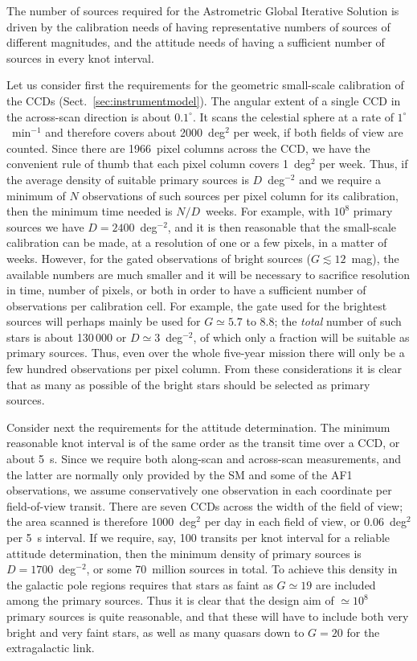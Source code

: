 \documentclass[structabstract]{aa}
\begin{document}
The number of sources required for the Astrometric Global Iterative Solution is
driven by the calibration needs of having representative numbers of sources of
different magnitudes, and the attitude needs of having a sufficient
number of sources in every knot interval.

Let us consider first the requirements for the geometric small-scale 
calibration of the CCDs (Sect.~\ref{sec:instrumentmodel}). The angular extent
of a single CCD in the across-scan direction is about $0.1^\circ$. It scans the
celestial sphere at a rate of $1^\circ$~min$^{-1}$ and therefore covers about 
2000~deg$^2$ per week, if both fields of view are counted. Since there are
1966~pixel columns across the CCD, we have the convenient rule of thumb
that each pixel column covers 1~deg$^2$ per week. Thus, if the average density
of suitable primary sources is $D$~deg$^{-2}$ and we require a minimum of $N$
observations of such sources per pixel column for its calibration, then the 
minimum time needed is $N/D$~weeks. For example, with $10^8$ primary 
sources we have $D=2400$~deg$^{-2}$, and it is then reasonable that the
small-scale calibration can be made, at a resolution of one or a few pixels,
in a matter of weeks. However, for the gated observations of bright sources
($G\lesssim 12$~mag), the available numbers are much smaller and it will be
necessary to sacrifice resolution in time, number of pixels, or both in order
to have a sufficient number of observations per calibration cell. For example,
the gate used for the brightest sources will perhaps mainly be used for 
$G\simeq 5.7$ to 8.8; the \emph{total} number of such stars is about 
130\,000 \citep[from the Tycho-2 Catalogue;][]{hog+00} or
$D\simeq 3$~deg$^{-2}$, of which only a fraction will be suitable as
primary sources. Thus, even over the whole five-year mission there will
only be a few hundred observations per pixel column. From these considerations
it is clear that as many as possible of the bright stars should be selected
as primary sources. 

Consider next the requirements for the attitude determination. The minimum
reasonable knot interval is of the same order as the transit time over a
CCD, or about 5~s. Since we require both along-scan and across-scan
measurements, and the latter are normally only provided by the SM and
some of the AF1 observations, we assume conservatively one observation in each
coordinate per field-of-view transit. There are seven CCDs across the
width of the field of view; the area scanned is therefore 1000~deg$^2$
per day in each field of view, or 0.06~deg$^2$ per 5~s interval. If we
require, say, 100 transits per knot interval for a reliable attitude
determination, then the minimum density of primary sources is
$D=1700$~deg$^{-2}$, or some 70~million sources in total. To 
achieve this density in the galactic pole regions requires that stars 
as faint as $G\simeq 19$ are included among the primary sources. 
Thus it is clear that the design aim of $\simeq 10^8$ primary sources
is quite reasonable, and that these will have to include both very bright
and very faint stars, as well as many quasars down to $G=20$ for
the extragalactic link.
\end{document}

